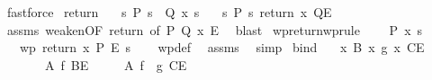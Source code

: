 \begin{isabellebody}
\ fastforce%
\endisatagproof
{\isafoldproof}%
%
\isadelimproof
\isanewline
%
\endisadelimproof
\isanewline
{}\isamarkupfalse%
\ return{\isacharprime}{\kern0pt}{\isacharcolon}{\kern0pt}\isanewline
\ \ \ {\isachardoublequoteopen}{\isasymforall}s{\isachardot}{\kern0pt}\ P\ s\ {\isasymlongrightarrow}\ Q\ x\ s{\isachardoublequoteclose}\isanewline
\ \ \ {\isachardoublequoteopen}{\isasymlbrace}{\isasymlambda}s{\isachardot}{\kern0pt}\ P\ s{\isasymrbrace}\ return\ x\ {\isasymlbrace}Q{\isasymrbrace}{\isacharcomma}{\kern0pt}{\isasymlbrace}E{\isasymrbrace}{\isachardoublequoteclose}\isanewline
%
\isadelimproof
\ \ %
\endisadelimproof
%
\isatagproof
{}\isamarkupfalse%
\ assms\ weaken{\isacharbrackleft}{\kern0pt}OF\ return{\isacharcomma}{\kern0pt}\ of\ P\ Q\ x\ E{\isacharbrackright}{\kern0pt}\ \isamarkupfalse%
\ blast%
\endisatagproof
{\isafoldproof}%
%
\isadelimproof
\isanewline
%
\endisadelimproof
\isanewline
{}\isamarkupfalse%
\ wpreturn{\isacharbrackleft}{\kern0pt}wprule{\isacharbrackright}{\kern0pt}{\isacharcolon}{\kern0pt}\ \isanewline
\ \ \ {\isachardoublequoteopen}P\ x\ s{\isachardoublequoteclose}\isanewline
\ \ \ {\isachardoublequoteopen}wp\ {\isacharparenleft}{\kern0pt}return\ x{\isacharparenright}{\kern0pt}\ P\ E\ s{\isachardoublequoteclose}\isanewline
%
\isadelimproof
\ \ %
\endisadelimproof
%
\isatagproof
{}\isamarkupfalse%
\ wp{\isacharunderscore}{\kern0pt}def\ \isamarkupfalse%
\ assms\ \isamarkupfalse%
\ simp%
\endisatagproof
{\isafoldproof}%
%
\isadelimproof
\isanewline
%
\endisadelimproof
\isanewline
{}\isamarkupfalse%
\ bind{\isacharcolon}{\kern0pt}\isanewline
\ \ \ {\isachardoublequoteopen}{\isasymforall}x{\isachardot}{\kern0pt}\ {\isasymlbrace}B\ x{\isasymrbrace}\ g\ x\ {\isasymlbrace}C{\isasymrbrace}{\isacharcomma}{\kern0pt}{\isasymlbrace}E{\isasymrbrace}{\isachardoublequoteclose}\isanewline
\ \ \ \ \ \ \ {\isachardoublequoteopen}{\isasymlbrace}A{\isasymrbrace}\ f\ {\isasymlbrace}B{\isasymrbrace}{\isacharcomma}{\kern0pt}{\isasymlbrace}E{\isasymrbrace}{\isachardoublequoteclose}\isanewline
\ \ \ \ \ {\isachardoublequoteopen}{\isasymlbrace}A{\isasymrbrace}\ f\ {\isasymbind}\ g\ {\isasymlbrace}C{\isasymrbrace}{\isacharcomma}{\kern0pt}{\isasymlbrace}E{\isasymrbrace}{\isachardoublequoteclose}\isanewline
%
\isadelimproof
\ \ %
\endisadelimproof
%
\isatagproof
{}\isamarkupfalse%

\end{isabellebody}
